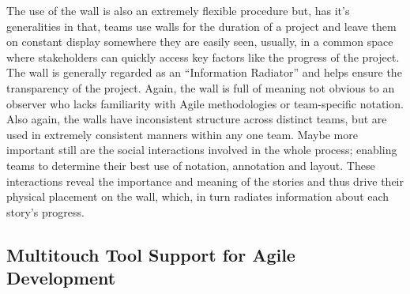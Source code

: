 \documentclass[lnbip,sechang,a4paper]{svmultln}
\begin{document}
The use of the wall is also an extremely flexible procedure but, has
it's generalities in that, teams use walls for the duration of a
project and leave them on constant display somewhere they are easily
seen, usually, in a common space where stakeholders can quickly access
key factors like the progress of the project. The wall is generally
regarded as an ``Information Radiator'' \cite{InfoRad} and helps
ensure the transparency of the project. Again, the wall is full of
meaning not obvious to an observer who lacks familiarity with Agile
methodologies or team-specific notation. Also again, the walls have
inconsistent structure across distinct teams, but are used in
extremely consistent manners within any one team.  Maybe more
important still are the social interactions involved in the whole
process; enabling teams to determine their best use of notation,
annotation and layout. These interactions reveal the importance and
meaning of the stories and thus drive their physical placement on the
wall, which, in turn radiates information about each story's progress.

\subsection{Multitouch Tool Support for Agile Development}
\end{document}
